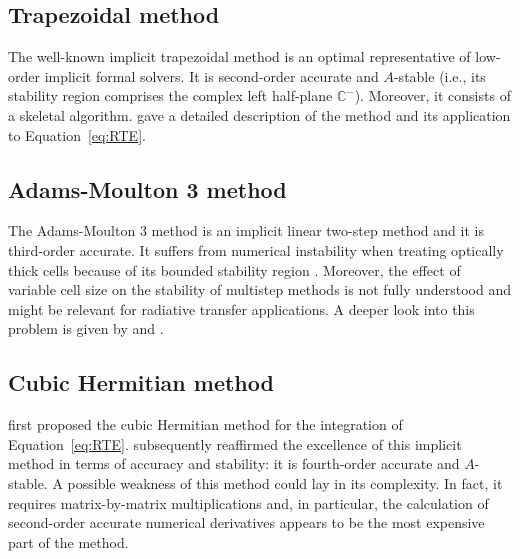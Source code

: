 \documentclass[iop,numberedappendix,twocolappendix,twocolumn]{emulateapj}
\begin{document}
\subsection{Trapezoidal method}\label{subsec:3.1}
%
The well-known implicit trapezoidal method is an optimal representative of low-order implicit formal solvers.
It is second-order accurate and $A$-stable (i.e., its stability region comprises the complex left half-plane $\mathbb{C}^{-}$).
Moreover, it consists of a skeletal algorithm.
\citet{janett2017a} gave a detailed description of the method and its application to Equation~\eqref{eq:RTE}.
%
\subsection{Adams-Moulton 3 method}\label{subsec:3.2}
%
The Adams-Moulton 3 method is an implicit linear two-step method and it is third-order accurate.
It suffers from numerical instability when treating optically thick cells because of its bounded stability region \citep{janett2017b}.
Moreover, the effect of variable cell size on the stability of multistep methods is not fully understood
and might be relevant for radiative transfer applications.
A deeper look into this problem is given by \citet{gear1974} and \citet{grigorieff1983}.
%
\subsection{Cubic Hermitian method}\label{subsec:3.5}
%
\citet{bellot_rubio+al1998} first proposed the cubic Hermitian method for the integration of Equation~\eqref{eq:RTE}.
\citet{janett2017b} subsequently reaffirmed the excellence of this implicit method in terms of accuracy and stability: it is fourth-order accurate and $A$-stable.
A possible weakness of this  method could lay in its complexity. In fact, it requires matrix-by-matrix multiplications
and, in particular, the calculation of second-order accurate numerical derivatives appears to be the most expensive part of the method.
\end{document}
